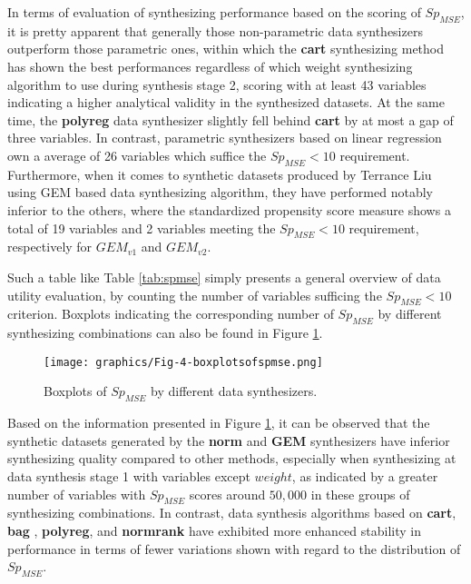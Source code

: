 In terms of evaluation of synthesizing performance based on the scoring of $Sp_{MSE}$, it is pretty apparent that generally those non-parametric data synthesizers outperform those parametric ones, within which the \textbf{cart} synthesizing method has shown the best performances regardless of which weight synthesizing algorithm to use during synthesis stage 2, scoring with at least 43 variables indicating a higher analytical validity in the synthesized datasets. At the same time, the \textbf{polyreg} data synthesizer slightly fell behind \textbf{cart} by at most a gap of three variables. In contrast, parametric synthesizers based on linear regression own a average of 26 variables which suffice the $Sp_{MSE}<10$ requirement. Furthermore, when it comes to synthetic datasets produced by Terrance Liu using GEM based data synthesizing algorithm, they have performed notably inferior to the others, where the standardized propensity score measure shows a total of 19 variables and 2 variables meeting the $Sp_{MSE}<10$ requirement, respectively for $GEM_{v1}$ and $GEM_{v2}$.

Such a table like Table \ref{tab:spmse} simply presents a general overview of data utility evaluation, by counting the number of variables sufficing the $Sp_{MSE}<10$ criterion. Boxplots indicating the corresponding number of $Sp_{MSE}$ by different synthesizing combinations can also be found in Figure \ref{fig:boxplots}.
\begin{figure}[H]
    \centering
    \texttt{[image: graphics/Fig-4-boxplotsofspmse.png]}    
    \caption{Boxplots of $Sp_{MSE}$ by different data synthesizers.}
    \label{fig:boxplots}
\end{figure}
Based on the information presented in Figure \ref{fig:boxplots}, it can be observed that the synthetic datasets generated by the \textbf{norm} and \textbf{GEM} synthesizers have inferior synthesizing quality compared to other methods, especially when synthesizing at data synthesis stage 1 with variables except $weight$, as indicated by a greater number of variables with $Sp_{MSE}$ scores around $50,000$ in these groups of synthesizing combinations. In contrast, data synthesis algorithms based on \textbf{cart}, \textbf{bag} , \textbf{polyreg}, and \textbf{normrank} have exhibited more enhanced stability in performance in terms of fewer variations shown with regard to the distribution of $Sp_{MSE}$.


